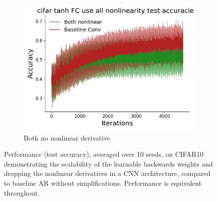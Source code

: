 \begin{figure}[htb]
\begin{subfigure}{0.3\textwidth}
  \includegraphics[width=\linewidth]{chapter_6_figures/AR/cifar_tanh_FC_use_all_nonlinearity_test_accuracies_prelim_1.jpg}
  \caption{Both no nonlinear derivative}
\end{subfigure}
\caption{Performance (test accuracy), averaged over 10 seeds, on CIFAR10 demonstrating the scalability of the learnable backwards weights and dropping the nonlinear derivatives in a CNN architecture, compared to baseline AR without simplifications. Performance is equivalent throughout.}
\end{figure}


